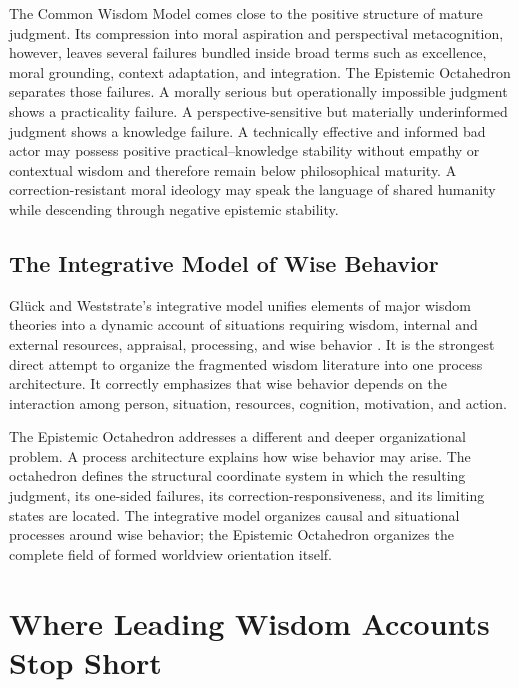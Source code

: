 \documentclass[11pt]{article}
\begin{document}
The Common Wisdom Model comes close to the positive structure of mature judgment. Its compression into moral aspiration and perspectival metacognition, however, leaves several failures bundled inside broad terms such as excellence, moral grounding, context adaptation, and integration. The Epistemic Octahedron separates those failures. A morally serious but operationally impossible judgment shows a practicality failure. A perspective-sensitive but materially underinformed judgment shows a knowledge failure. A technically effective and informed bad actor may possess positive practical--knowledge stability without empathy or contextual wisdom and therefore remain below philosophical maturity. A correction-resistant moral ideology may speak the language of shared humanity while descending through negative epistemic stability.

\subsection{The Integrative Model of Wise Behavior}

Gl\"uck and Weststrate's integrative model unifies elements of major wisdom theories into a dynamic account of situations requiring wisdom, internal and external resources, appraisal, processing, and wise behavior \cite{gluckweststrate2022}. It is the strongest direct attempt to organize the fragmented wisdom literature into one process architecture. It correctly emphasizes that wise behavior depends on the interaction among person, situation, resources, cognition, motivation, and action.

The Epistemic Octahedron addresses a different and deeper organizational problem. A process architecture explains how wise behavior may arise. The octahedron defines the structural coordinate system in which the resulting judgment, its one-sided failures, its correction-responsiveness, and its limiting states are located. The integrative model organizes causal and situational processes around wise behavior; the Epistemic Octahedron organizes the complete field of formed worldview orientation itself.

\section{Where Leading Wisdom Accounts Stop Short}
\end{document}
